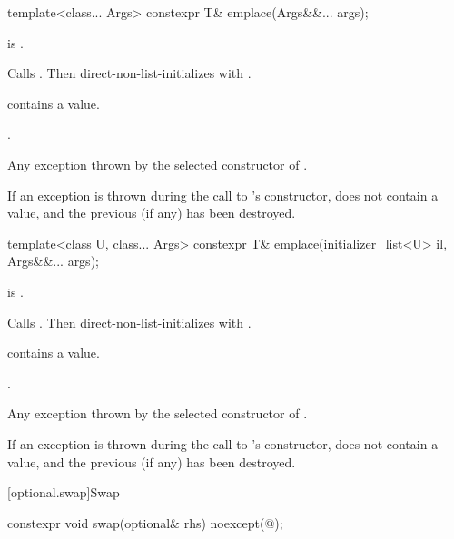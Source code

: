 %
\begin{itemdecl}
template<class... Args> constexpr T& emplace(Args&&... args);
\end{itemdecl}

\begin{itemdescr}
\pnum
\mandates
{} is .

\pnum
\effects
Calls . Then direct-non-list-initializes 
with .

\pnum
\ensures
{} contains a value.

\pnum
\returns
{}.

\pnum
\throws
Any exception thrown by the selected constructor of .

\pnum
\remarks
If an exception is thrown during the call to 's constructor,
 does not contain a value, and
the previous  (if any) has been destroyed.
\end{itemdescr}

%
\begin{itemdecl}
template<class U, class... Args> constexpr T& emplace(initializer_list<U> il, Args&&... args);
\end{itemdecl}

\begin{itemdescr}
\pnum
\constraints
{} is .

\pnum
\effects
Calls . Then direct-non-list-initializes  with
.

\pnum
\ensures
{} contains a value.

\pnum
\returns
{}.

\pnum
\throws
Any exception thrown by the selected constructor of .

\pnum
\remarks
If an exception is thrown during the call to 's constructor,
 does not contain a value, and
the previous  (if any) has been destroyed.
\end{itemdescr}

[optional.swap]{Swap}

%
\begin{itemdecl}
constexpr void swap(optional& rhs) noexcept(@\seebelow@);
\end{itemdecl}

